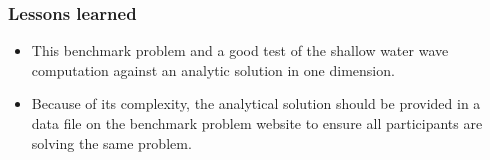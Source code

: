 \subsubsection{Lessons learned}

\begin{itemize}
\item This benchmark problem and a good test of the shallow water wave computation against an analytic solution in one dimension.
\item Because of its complexity, the analytical solution should be provided in a data file on the benchmark problem website to ensure all participants are solving the same problem.
\end{itemize}
